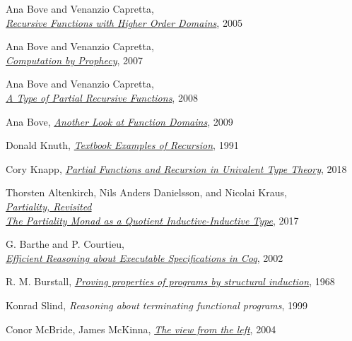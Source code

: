 \documentclass[declaration,mgr,english,shortabstract]{iithesis}
\begin{document}
\begin{thebibliography}{1}
    Ana Bove and Venanzio Capretta, \\
    \href{http://www.cs.ru.nl/~venanzio/publications/Higher_Domains_TLCA2005.pdf}{\textit{Recursive Functions with Higher Order Domains}},
    2005

    Ana Bove and Venanzio Capretta, \\
    \href{https://www.researchgate.net/publication/220727479_Computation_by_Prophecy}{\textit{Computation by Prophecy}},
    2007

    Ana Bove and Venanzio Capretta, \\
    \href{https://www.researchgate.net/publication/221302295_A_Type_of_Partial_Recursive_Functions}{\textit{A Type of Partial Recursive Functions}},
    2008

    Ana Bove,
    \href{https://core.ac.uk/download/pdf/82578788.pdf}{\textit{Another Look at Function Domains}},
    2009

    Donald Knuth,
    \href{https://arxiv.org/pdf/cs/9301113.pdf}{\textit{Textbook Examples of Recursion}},
    1991

    Cory Knapp,
    \href{https://etheses.bham.ac.uk//id/eprint/8448/4/Knapp18PhD.pdf}{\textit{Partial Functions and Recursion in Univalent Type Theory}},
    2018

    Thorsten Altenkirch, Nils Anders Danielsson, and Nicolai Kraus, \\
    \href{https://arxiv.org/pdf/1610.09254.pdf}{\textit{Partiality, Revisited \\The Partiality Monad as a Quotient Inductive-Inductive Type}},
    2017

    G. Barthe and P. Courtieu, \\
    \href{https://www.researchgate.net/publication/221302198_Efficient_Reasoning_about_Executable_Specifications_in_Coq}{\textit{Efficient Reasoning about Executable Specifications in Coq}},
    2002

    R. M. Burstall,
    \href{http://www.cse.chalmers.se/edu/year/2010/course/DAT140_Types/Burstall.pdf}{\textit{Proving properties of programs by structural induction}},
    1968

    Konrad Slind,
    \textit{Reasoning about terminating functional programs},
    1999

    Conor McBride, James McKinna,
    \href{https://www.researchgate.net/publication/220676549_The_view_from_the_left}{\textit{The view from the left}},
    2004


\end{thebibliography}
\end{document}
